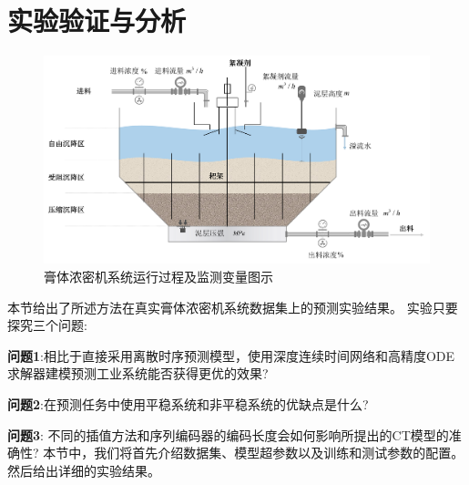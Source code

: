 \section{实验验证与分析}
\label{sec:case}

\begin{figure}[t]
\centering
\includegraphics[width=\linewidth]{figures/chapter3/thickener.pdf}
\caption{
膏体浓密机系统运行过程及监测变量图示
}
\label{fig:nfca_thickener}
\end{figure}

本节给出了所述方法在真实膏体浓密机系统数据集上的预测实验结果。
实验只要探究三个问题:

\textbf{问题1}:相比于直接采用离散时序预测模型，使用深度连续时间网络和高精度ODE求解器建模预测工业系统能否获得更优的效果?

\textbf{问题2}:在预测任务中使用平稳系统和非平稳系统的优缺点是什么?

\textbf{问题3}: 不同的插值方法和序列编码器的编码长度会如何影响所提出的CT模型的准确性?
本节中，我们将首先介绍数据集、模型超参数以及训练和测试参数的配置。然后给出详细的实验结果。

